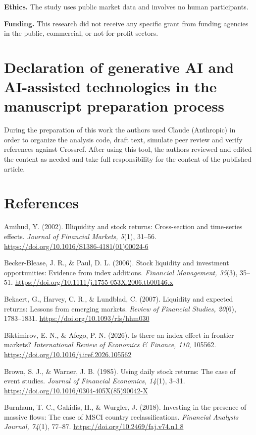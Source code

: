 \documentclass[review,authoryear,12pt]{elsarticle}
\begin{document}
\textbf{Ethics.} The study uses public market data and involves no human
participants.

\textbf{Funding.} This research did not receive any specific grant from
funding agencies in the public, commercial, or not-for-profit sectors.

\hypertarget{declaration-of-generative-ai-and-ai-assisted-technologies-in-the-manuscript-preparation-process}{%
\section*{Declaration of generative AI and AI-assisted technologies in
the manuscript preparation
process}}

During the preparation of this work the authors used Claude (Anthropic)
in order to organize the analysis code, draft text, simulate peer review
and verify references against Crossref. After using this tool, the
authors reviewed and edited the content as needed and take full
responsibility for the content of the published article.

\hypertarget{references}{%
\section*{References}}

Amihud, Y. (2002). Illiquidity and stock returns: Cross-section and
time-series effects. \emph{Journal of Financial Markets, 5}(1), 31--56.
\url{https://doi.org/10.1016/S1386-4181(01)00024-6}

Becker-Blease, J. R., \& Paul, D. L. (2006). Stock liquidity and
investment opportunities: Evidence from index additions. \emph{Financial
Management, 35}(3), 35--51.
\url{https://doi.org/10.1111/j.1755-053X.2006.tb00146.x}

Bekaert, G., Harvey, C. R., \& Lundblad, C. (2007). Liquidity and
expected returns: Lessons from emerging markets. \emph{Review of
Financial Studies, 20}(6), 1783--1831.
\url{https://doi.org/10.1093/rfs/hhm030}

Biktimirov, E. N., \& Afego, P. N. (2026). Is there an index effect in
frontier markets? \emph{International Review of Economics \& Finance,
110}, 105562. \url{https://doi.org/10.1016/j.iref.2026.105562}

Brown, S. J., \& Warner, J. B. (1985). Using daily stock returns: The
case of event studies. \emph{Journal of Financial Economics, 14}(1),
3--31. \url{https://doi.org/10.1016/0304-405X(85)90042-X}

Burnham, T. C., Gakidis, H., \& Wurgler, J. (2018). Investing in the
presence of massive flows: The case of MSCI country reclassifications.
\emph{Financial Analysts Journal, 74}(1), 77--87.
\url{https://doi.org/10.2469/faj.v74.n1.8}
\end{document}
